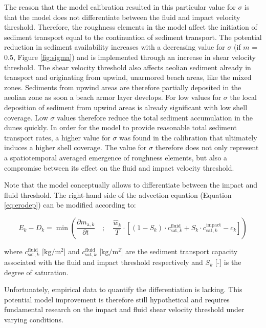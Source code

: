 The reason that the model calibration resulted in this particular
value for $\sigma$ is that the model does not differentiate between
the fluid and impact velocity threshold.  Therefore, the roughness
elements in the model affect the initiation of sediment transport
equal to the continuation of sediment transport. The potential
reduction in sediment availability increases with a decreasing value
for $\sigma$ (if $m$ = 0.5, Figure \ref{fig:sigma}) and is implemented
through an increase in shear velocity threshold. The shear velocity
threshold also affects aeolian sediment already in transport and
originating from upwind, unarmored beach areas, like the mixed
zones. Sediments from upwind areas are therefore partially deposited
in the aeolian zone as soon a beach armor layer develops. For low
values for $\sigma$ the local deposition of sediment from upwind areas
is already significant with low shell coverage. Low $\sigma$ values
therefore reduce the total sediment accumulation in the dunes
quickly. In order for the model to provide reasonable total sediment
transport rates, a higher value for $\sigma$ was found in the
calibration that ultimately induces a higher shell coverage. The value
for $\sigma$ therefore does not only represent a spatiotemporal
averaged emergence of roughness elements, but also a compromise
between its effect on the fluid and impact velocity threshold.

Note that the model conceptually allows to differentiate between the
impact and fluid threshold. The right-hand side of the advection
equation (Equation \ref{eq:erodep}) can be modified according to:

\begin{equation}
  \label{eq:erodep_split}
  E_k - D_k = \min \left( 
  \frac{\partial m_{\mathrm{a},k}}{\partial t} \quad ; \quad 
  \frac{\hat{w}_k}{T} \cdot \left[
    (1 - S_k) \cdot c^{\mathrm{fluid}}_{\mathrm{sat},k} +
    S_k \cdot c^{\mathrm{impact}}_{\mathrm{sat},k} - c_k
    \right]
  \right)
\end{equation}

\noindent where $c^{\mathrm{fluid}}_{\mathrm{sat},k}$
[$\mathrm{kg/m^2}$] and $c^{\mathrm{fluid}}_{\mathrm{sat},k}$
[$\mathrm{kg/m^2}$] are the sediment transport capacity associated
with the fluid and impact threshold respectively and $S_k$ [-] is the
degree of saturation.

Unfortunately, empirical data to quantify the differentiation is
lacking. This potential model improvement is therefore still
hypothetical and requires fundamental research on the impact and fluid
shear velocity threshold under varying conditions.



